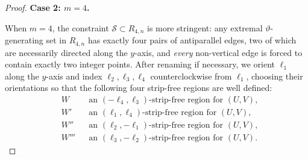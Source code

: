 \documentclass[12pt]{amsart}
\numberwithin{equation}{section}
\begin{document}
\begin{proof}
\medbreak

\textbf{Case 2: $m = 4$.}

\medbreak

When $m = 4$, the constraint $\mathcal{S} \subset R_{4,n}$ is more
stringent: any extremal $\vartheta$-generating set in $R_{4,n}$ has exactly four
pairs of antiparallel edges, two of which are necessarily directed along the $y$-axis, 
and \emph{every} non-vertical edge is forced to contain exactly two integer points. 
After renaming if necessary, we orient $\ell_1$ along the $y$-axis and index $\ell_2,\ell_3,\ell_4$ counterclockwise from
$\pmb{\ell}_1$, choosing their orientations so that the following four strip-free regions are well defined: 
\begin{equation*}
\left.
\begin{aligned}
&W &&\text{an } (-\pmb{\ell}_4,\pmb{\ell}_3)\text{-strip-free region for }(U,V),\\
&W' &&\text{an } (\pmb{\ell}_1,\pmb{\ell}_4)\text{-strip-free region for }(U,V),\\
&W'' &&\text{an } (\pmb{\ell}_2,-\pmb{\ell}_1)\text{-strip-free region for }(U,V), \\
&W''' &&\text{an } (\pmb{\ell}_3,-\pmb{\ell}_2)\text{-strip-free region for }(U,V).
\end{aligned}
\right.
\end{equation*}


\end{proof}
\end{document}
